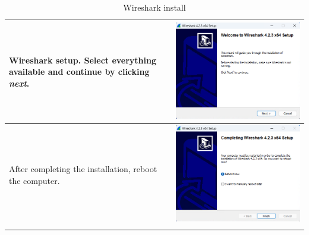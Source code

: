 \documentclass[11pt,a4paper]{report}
\begin{document}
\begin{flushleft}
\begin{center}
\begin{longtable}{ m{5cm} l }
                        Wireshark setup. Select everything available and continue by clicking \textit{next}.
                        & \includegraphics[scale=0.80,valign=c]{phase1/images/install_wireshark02} \\
                        \hline
                        After completing the installation, reboot the computer.
                        & \includegraphics[scale=0.80,valign=c]{phase1/images/install_wireshark21} \\
                        \hline

                        \caption{Wireshark install} \label{tab:wireshark}
                    \end{longtable}
                \end{center}
        \end{flushleft}
\end{document}
